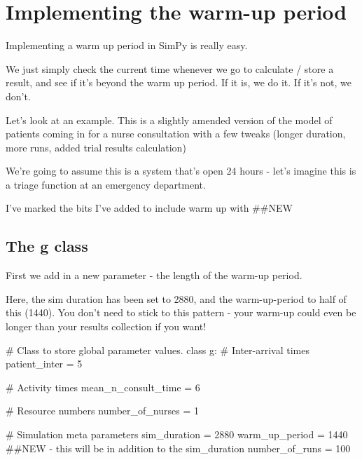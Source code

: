 \documentclass[
  letterpaper,
  DIV=11,
  numbers=noendperiod]{scrreprt}
\newenvironment{Shaded}{}{}
\newcommand{\CommentTok}[1]{\textcolor[rgb]{0.42,0.45,0.49}{#1}}
\newcommand{\DecValTok}[1]{\textcolor[rgb]{0.00,0.36,0.77}{#1}}
\newcommand{\KeywordTok}[1]{\textcolor[rgb]{0.84,0.23,0.29}{#1}}
\newcommand{\NormalTok}[1]{\textcolor[rgb]{0.14,0.16,0.18}{#1}}
\newcommand{\OperatorTok}[1]{\textcolor[rgb]{0.14,0.16,0.18}{#1}}
\begin{document}
\section{Implementing the warm-up
period}\label{implementing-the-warm-up-period}

Implementing a warm up period in SimPy is really easy.

We just simply check the current time whenever we go to calculate /
store a result, and see if it's beyond the warm up period. If it is, we
do it. If it's not, we don't.

Let's look at an example. This is a slightly amended version of the
model of patients coming in for a nurse consultation with a few tweaks
(longer duration, more runs, added trial results calculation)

We're going to assume this is a system that's open 24 hours - let's
imagine this is a triage function at an emergency department.

I've marked the bits I've added to include warm up with \#\#NEW

\subsection{The g class}\label{the-g-class-2}

First we add in a new parameter - the length of the warm-up period.

Here, the sim duration has been set to 2880, and the warm-up-period to
half of this (1440). You don't need to stick to this pattern - your
warm-up could even be longer than your results collection if you want!

\label{g_class}
\begin{Shaded}
\begin{Highlighting}[]
\CommentTok{\# Class to store global parameter values.}
\KeywordTok{class}\NormalTok{ g:}
    \CommentTok{\# Inter{-}arrival times}
\NormalTok{    patient\_inter }\OperatorTok{=} \DecValTok{5}

    \CommentTok{\# Activity times}
\NormalTok{    mean\_n\_consult\_time }\OperatorTok{=} \DecValTok{6}

    \CommentTok{\# Resource numbers}
\NormalTok{    number\_of\_nurses }\OperatorTok{=} \DecValTok{1}

    \CommentTok{\# Simulation meta parameters}
\NormalTok{    sim\_duration }\OperatorTok{=} \DecValTok{2880}
\NormalTok{    warm\_up\_period }\OperatorTok{=} \DecValTok{1440} \CommentTok{\#\#NEW {-} this will be in addition to the sim\_duration}
\NormalTok{    number\_of\_runs }\OperatorTok{=} \DecValTok{100}
\end{Highlighting}
\end{Shaded}
\end{document}
